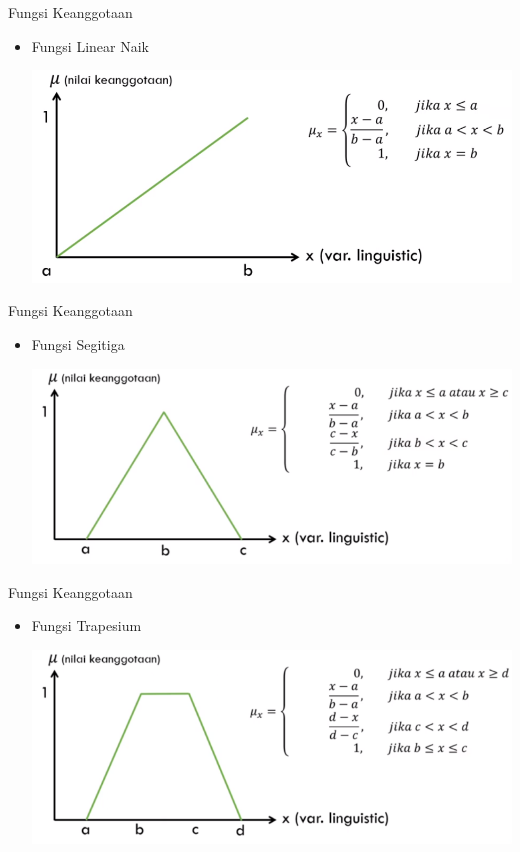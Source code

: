\documentclass[pdflatex,compress,mathserif]{beamer}
\begin{document}
\begin{frame}{Fungsi Keanggotaan}
	\begin{itemize}
		\item Fungsi Linear Naik
		\begin{center}
			\includegraphics[width=\linewidth]{img/15}
		\end{center}
	\end{itemize}
\end{frame}

\begin{frame}{Fungsi Keanggotaan}
	\begin{itemize}
		\item Fungsi Segitiga
		\begin{center}
			\includegraphics[width=\linewidth]{img/16}
		\end{center}
	\end{itemize}
\end{frame}

\begin{frame}{Fungsi Keanggotaan}
	\begin{itemize}
		\item Fungsi Trapesium
		\begin{center}
			\includegraphics[width=\linewidth]{img/17}
		\end{center}
	\end{itemize}
\end{frame}
\end{document}
